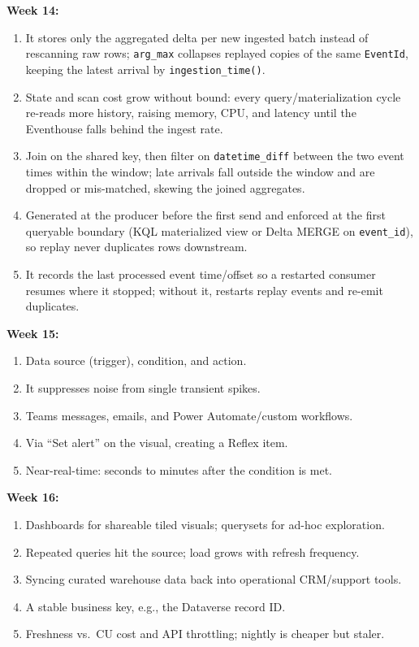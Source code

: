 \documentclass[11pt, a4paper]{article}
\begin{document}
\noindent\textbf{Week 14:}
\begin{enumerate}[leftmargin=8mm, itemsep=0pt]
    \item It stores only the aggregated delta per new ingested batch instead of rescanning raw rows; \texttt{arg\_max} collapses replayed copies of the same \texttt{EventId}, keeping the latest arrival by \texttt{ingestion\_time()}.
    \item State and scan cost grow without bound: every query/materialization cycle re-reads more history, raising memory, CPU, and latency until the Eventhouse falls behind the ingest rate.
    \item Join on the shared key, then filter on \texttt{datetime\_diff} between the two event times within the window; late arrivals fall outside the window and are dropped or mis-matched, skewing the joined aggregates.
    \item Generated at the producer before the first send and enforced at the first queryable boundary (KQL materialized view or Delta MERGE on \texttt{event\_id}), so replay never duplicates rows downstream.
    \item It records the last processed event time/offset so a restarted consumer resumes where it stopped; without it, restarts replay events and re-emit duplicates.
\end{enumerate}

\noindent\textbf{Week 15:}
\begin{enumerate}[leftmargin=8mm, itemsep=0pt]
    \item Data source (trigger), condition, and action.
    \item It suppresses noise from single transient spikes.
    \item Teams messages, emails, and Power Automate/custom workflows.
    \item Via ``Set alert'' on the visual, creating a Reflex item.
    \item Near-real-time: seconds to minutes after the condition is met.
\end{enumerate}

\noindent\textbf{Week 16:}
\begin{enumerate}[leftmargin=8mm, itemsep=0pt]
    \item Dashboards for shareable tiled visuals; querysets for ad-hoc exploration.
    \item Repeated queries hit the source; load grows with refresh frequency.
    \item Syncing curated warehouse data back into operational CRM/support tools.
    \item A stable business key, e.g., the Dataverse record ID.
    \item Freshness vs.\ CU cost and API throttling; nightly is cheaper but staler.
\end{enumerate}
\end{document}
